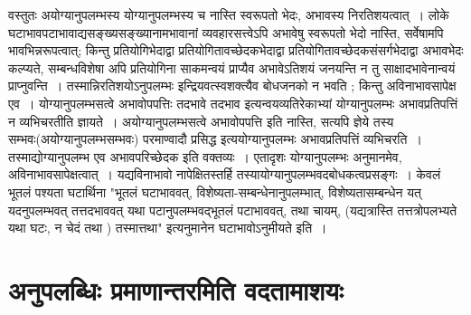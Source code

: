 {वस्तुतः अयोग्यानुपलम्भस्य योग्यानुपलम्भस्य च नास्ति स्वरूपतो भेदः, अभावस्य \-निरतिशयत्वात्~। लोके घटाभावपटाभावाद्यसङ्ख्यसङ्ख्यानामभावानां व्यवहारसत्त्वेऽपि \-अभावेषु स्वरूपतो भेदो नास्ति, सर्वेषामपि भावभिन्नरूपत्वात्; किन्तु प्रतियोगिभेदाद्वा \break प्रतियोगितावच्छेदकभेदाद्वा प्रतियोगितावच्छेदकसंसर्गभेदाद्वा अभावभेदः कल्प्यते, सम्बन्ध\-विशेषा अपि प्रतियोगिना साकमन्वयं प्राप्यैव अभावेऽतिशयं जनयन्ति न तु साक्षादभावे\-नान्वयं प्राप्नुवन्ति~। तस्मान्निरतिशयोऽनुपलम्भः इन्द्रियवत्स्वशक्त्यैव बोधजनको न \break भवति ; किन्तु अविनाभावसापेक्ष एव~। योग्यानुपलम्भसत्वे अभावोपपत्तिः तदभावे तदभाव इत्यन्वयव्यतिरेकाभ्यां योग्यानुपलम्भः अभावप्रतिपत्तिं न व्यभिचरतीति ज्ञायते~। अयोग्यानुपलम्भसत्वे अभावोपपत्ति इति नास्ति, सत्यपि ज्ञेये तस्य सम्भवः(अयोग्यानुपलम्भसम्भवः) \break परमाण्वादौ प्रसिद्ध इत्ययोग्यानुपलम्भः अभावप्रतिपत्तिं व्यभिचरति~। तस्माद्योग्यानुपलम्भ एव अभावपरिच्छेदक इति वक्तव्यः~। एतादृशः योग्यानुपलम्भः अनुमानमेव, अविनाभावसापेक्षत्वात्~। यद्यविनाभावो नापेक्षितस्तर्हि तस्यायोग्यानुपलम्भवदबोधकत्वप्रसङ्गः~। केवलं भूतलं पश्यता घटार्थिना "भूतलं घटाभाववत्, विशेष्यता-सम्बन्धेनानुपलम्भात्, विशेष्यता\-सम्बन्धेन यत् यदनुपलम्भवत् तत्तदभाववत् यथा पटानुपलम्भवद्भूतलं पटाभाववत्, तथा \-चायम्, (यद्यत्रास्ति तत्तत्रोपलभ्यते यथा घटः, न चेदं तथा ) तस्मात्तथा" इत्यनुमानेन \break घटाभावोऽनुमीयते इति~। 

\section*{अनुपलब्धिः प्रमाणान्तरमिति वदतामाशयः} 

}

